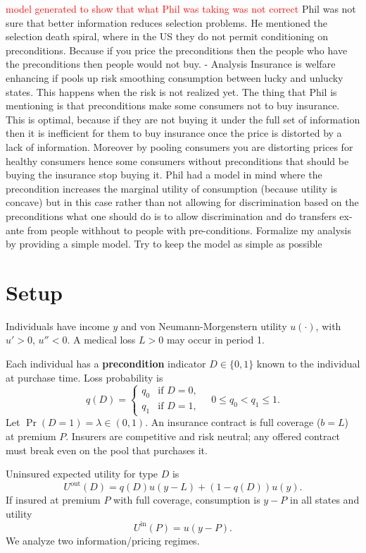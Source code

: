 \documentclass[12pt]{article}
\theoremstyle{plain}
\theoremstyle{plain}
\begin{document}
\textcolor{red}{model generated to show that what Phil was taking was not correct}
Phil was not sure that better information reduces selection problems. He mentioned the selection death spiral, where in the US they do not permit conditioning on preconditions. Because if you price the preconditions then the people who have the preconditions then people would not buy. - Analysis Insurance is welfare enhancing if pools up risk smoothing consumption between lucky and unlucky states. This happens when the risk is not realized yet. The thing that Phil is mentioning is that preconditions make some consumers not to buy insurance. This is optimal, because if they are not buying it under the full set of information then it is inefficient for them to buy insurance once the price is distorted by a lack of information. Moreover by pooling consumers you are distorting prices for healthy consumers hence some consumers without preconditions that should be buying the insurance stop buying it. Phil had a model in mind where the precondition increases the marginal utility of consumption (because utility is concave) but in this case rather than not allowing for discrimination based on the preconditions what one should do is to allow discrimination and do transfers ex-ante from people withhout to people with pre-conditions. Formalize my analysis by providing a simple model. Try to keep the model as simple as possible
\section*{Setup}

Individuals have income $y$ and von Neumann-Morgenstern utility $u(\cdot)$, with $u' > 0$, $u'' < 0$. A medical loss $L > 0$ may occur in period 1.

Each individual has a \textbf{precondition} indicator $D \in \{0, 1\}$ known to the individual at purchase time. Loss probability is
\begin{equation}
q(D) = 
\begin{cases}
    q_0 & \text{if } D = 0, \\
    q_1 & \text{if } D = 1,
\end{cases}
\quad 0 \le q_0 < q_1 \le 1.
\tag{1}
\end{equation}
Let $\Pr(D=1) = \lambda \in (0,1)$. An insurance contract is full coverage ($b=L$) at premium $P$. Insurers are competitive and risk neutral; any offered contract must break even on the pool that purchases it.

Uninsured expected utility for type $D$ is
\begin{equation}
U^{\text{out}}(D) = q(D) u(y-L) + (1-q(D)) u(y).
\tag{2}
\end{equation}
If insured at premium $P$ with full coverage, consumption is $y-P$ in all states and utility
\begin{equation}
U^{\text{in}}(P) = u(y-P).
\tag{3}
\end{equation}
We analyze two information/pricing regimes.
\end{document}
